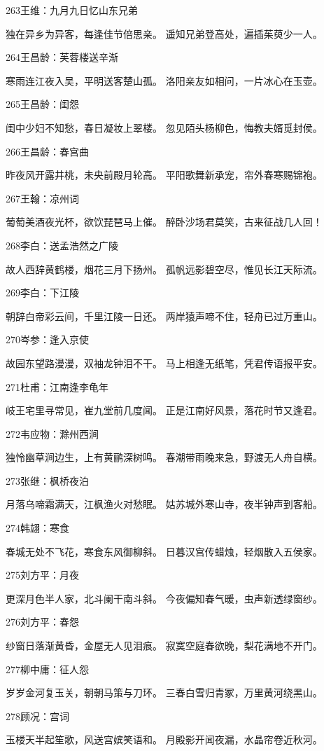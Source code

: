 263王维：九月九日忆山东兄弟

独在异乡为异客，每逢佳节倍思亲。
遥知兄弟登高处，遍插茱萸少一人。

264王昌龄：芙蓉楼送辛渐

寒雨连江夜入吴，平明送客楚山孤。
洛阳亲友如相问，一片冰心在玉壶。

265王昌龄：闺怨

闺中少妇不知愁，春日凝妆上翠楼。
忽见陌头杨柳色，悔教夫婿觅封侯。

266王昌龄：春宫曲

昨夜风开露井桃，未央前殿月轮高。
平阳歌舞新承宠，帘外春寒赐锦袍。

267王翰：凉州词

葡萄美酒夜光杯，欲饮琵琶马上催。
醉卧沙场君莫笑，古来征战几人回！

268李白：送孟浩然之广陵

故人西辞黄鹤楼，烟花三月下扬州。
孤帆远影碧空尽，惟见长江天际流。

269李白：下江陵

朝辞白帝彩云间，千里江陵一日还。
两岸猿声啼不住，轻舟已过万重山。

270岑参：逢入京使

故园东望路漫漫，双袖龙钟泪不干。
马上相逢无纸笔，凭君传语报平安。

271杜甫：江南逢李龟年

岐王宅里寻常见，崔九堂前几度闻。
正是江南好风景，落花时节又逢君。

272韦应物：滁州西涧

独怜幽草涧边生，上有黄鹂深树鸣。
春潮带雨晚来急，野渡无人舟自横。

273张继：枫桥夜泊

月落乌啼霜满天，江枫渔火对愁眠。
姑苏城外寒山寺，夜半钟声到客船。

274韩翃：寒食

春城无处不飞花，寒食东风御柳斜。
日暮汉宫传蜡烛，轻烟散入五侯家。

275刘方平：月夜

更深月色半人家，北斗阑干南斗斜。
今夜偏知春气暖，虫声新透绿窗纱。

276刘方平：春怨

纱窗日落渐黄昏，金屋无人见泪痕。
寂寞空庭春欲晚，梨花满地不开门。

277柳中庸：征人怨

岁岁金河复玉关，朝朝马策与刀环。
三春白雪归青冢，万里黄河绕黑山。

278顾况：宫词

玉楼天半起笙歌，风送宫嫔笑语和。
月殿影开闻夜漏，水晶帘卷近秋河。


